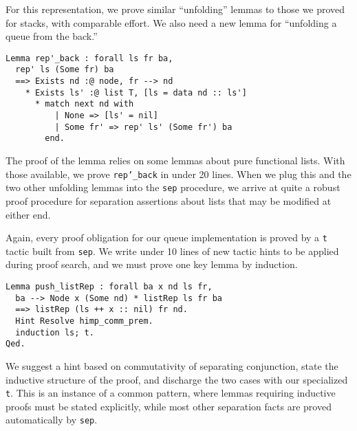 \documentclass[preprint,nocopyrightspace]{sigplanconf}
\newcommand{\cd}[1]{\texttt{#1}}
\begin{document}
For this representation, we prove similar ``unfolding'' lemmas to those we proved for stacks, with comparable effort.  We also need a new lemma for ``unfolding a queue from the back.''

\begin{verbatim}
Lemma rep'_back : forall ls fr ba,
  rep' ls (Some fr) ba
  ==> Exists nd :@ node, fr --> nd
    * Exists ls' :@ list T, [ls = data nd :: ls']
      * match next nd with
          | None => [ls' = nil]
          | Some fr' => rep' ls' (Some fr') ba
        end.
\end{verbatim}

The proof of the lemma relies on some lemmas about pure functional lists.  With those available, we prove \cd{rep'\_back} in under 20 lines.  When we plug this and the two other unfolding lemmas into the \cd{sep} procedure, we arrive at quite a robust proof procedure for separation assertions about lists that may be modified at either end.

Again, every proof obligation for our queue implementation is proved by a \cd{t} tactic built from \cd{sep}.  We write under 10 lines of new tactic hints to be applied during proof search, and we must prove one key lemma by induction.

\begin{verbatim}
Lemma push_listRep : forall ba x nd ls fr,
  ba --> Node x (Some nd) * listRep ls fr ba
  ==> listRep (ls ++ x :: nil) fr nd.
  Hint Resolve himp_comm_prem.
  induction ls; t.
Qed.
\end{verbatim}

We suggest a hint based on commutativity of separating conjunction, state the inductive structure of the proof, and discharge the two cases with our specialized \cd{t}.  This is an instance of a common pattern, where lemmas requiring inductive proofs must be stated explicitly, while most other separation facts are proved automatically by \cd{sep}.




\end{document}
